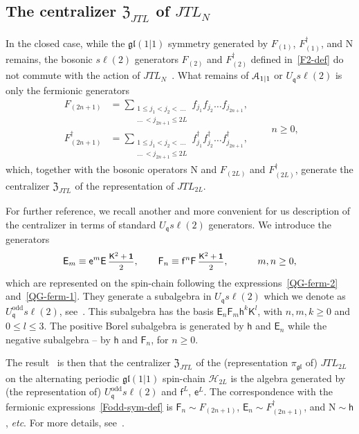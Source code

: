 \documentclass[11pt]{article}
\newcommand{\one}{\boldsymbol{1}}%
\newcommand{\q}{\mathfrak{q}}
\newcommand{\ffrac}[2]{\mbox{\footnotesize$\displaystyle\frac{#1}{#2}$}}
\newcommand{\JTL}[1]{JTL_{#1}}
\newcommand{\LQG}{U_{\q} s\ell(2)}
\newcommand{\LQGodd}{U^{\text{odd}}_{\q} s\ell(2)}
\newcommand{\K}{\mathsf{K}}
\newcommand{\F}{\mathsf{F}}
\newcommand{\FF}[1]{\F_{#1}}
\newcommand{\f}{\mathsf{f}}
\newcommand{\E}{\mathsf{E}}
\newcommand{\EE}[1]{\E_{#1}}
\newcommand{\h}{\mathsf{h}}
\newcommand{\e}{\mathsf{e}}
\newcommand{\Hilb}{\mathcal{H}}
\newcommand{\gl}{\mathfrak{gl}}
\newcommand{\repgl}{\pi_{\gl}}
\newcommand{\cent}{\mathfrak{Z}}
\newcommand{\centJTL}{\cent_{\JTL{}}}
\newcommand{\N}{\mathrm N}
\theoremstyle{definition}
\begin{document}
\subsection{The centralizer $\centJTL$ of  $\JTL{N}$}\label{subsec:cent}

In the closed case, while the $\gl(1|1)$ symmetry
generated by $F_{(1)}$, $F^\dagger_{(1)}$, and ${\N}$ remains, the
bosonic $s\ell(2)$ generators $F_{(2)}$ and $F^\dagger_{(2)}$ defined in~\eqref{F2-def} do not
commute with the action of $\JTL{N}$~\cite{GRS1}. What remains of  ${\cal A}_{1|1}$  or $\LQG$ is
only the fermionic  generators
\begin{equation}\label{Fodd-sym-def}
\begin{split}
F_{(2n+1)}&=\!\!\!\!\sum_{\substack{1\leq
  j_1<j_2<\,\dots\\\dots\,<j_{2n+1}\leq 2L}}f_{j_1}f_{j_2}\dots f_{j_{2n+1}},\\
F^\dagger_{(2n+1)}&=\!\!\!\!\sum_{\substack{1\leq
  j_1<j_2<\,\dots\\\dots\,<j_{2n+1}\leq
  2L}}f^\dagger_{j_1}f^\dagger_{j_2}\dots f^\dagger_{j_{2n+1}},
\end{split}
\qquad n\geq0,
\end{equation}
which, together with the bosonic operators  $\N$ and $F_{(2L)}$ and $F^\dagger_{(2L)}$, generate the
centralizer $\centJTL$ of the representation of $\JTL{2L}$.

 For further reference, we recall another and more convenient for us description of the centralizer in terms of standard $\LQG$ generators. We introduce the generators
%
\begin{equation}\label{LQGodd-LQG-hom}
\EE m\equiv \e^m\E\,\ffrac{\K^2+\one}{2},\qquad \FF n \equiv
\f^n\F\,\ffrac{\K^2+\one}{2},\qquad\quad m,n\geq0,
\end{equation}
%
which are represented on the spin-chain following the
expressions~\eqref{QG-ferm-2} and~\eqref{QG-ferm-1}.
They generate a subalgebra in $\LQG$ which we denote as
$\LQGodd$, see~\cite[Dfn. 3.3.1]{GRS1}. This subalgebra has the  basis $\EE n \FF m \h^k\K^l$, with
$n,m,k\geq0$ and $0 \leq l \leq 3$.
The positive Borel
subalgebra is generated by $\h$ and $\EE n$ while the negative subalgebra -- by $\h$ and $\FF n$, for $n\geq0$.

The result~\cite[Thm. 3.3.3]{GRS1} is then that the
centralizer $\centJTL$ of the (representation $\repgl$ of) $\JTL{2L}$ on the alternating
periodic $\gl(1|1)$ spin-chain $\Hilb_{2L}$ is the algebra
generated by (the representation of) $\LQGodd$ and $\f^L$, $\e^L$. The correspondence with the fermionic expressions~\eqref{Fodd-sym-def} is $\FF n\sim F_{(2n+1)}$, $\EE n\sim F^\dagger_{(2n+1)}$, and $\N\sim \h$, \textit{etc}.
For more details, see~\cite[Sec.~3.3.4]{GRS1}.
\end{document}
